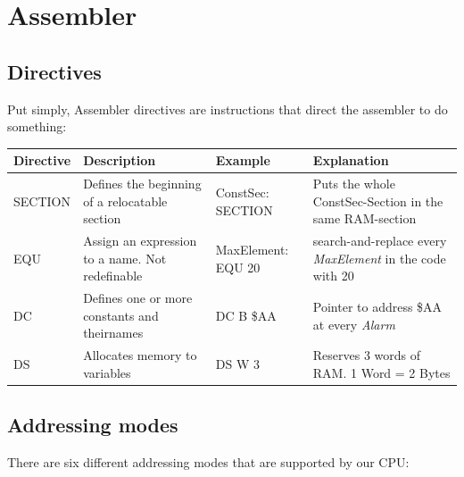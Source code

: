 \documentclass[a4paper, 11pt, nofootinbib]{book}
\renewcommand*{\thead}[1]{\bfseries #1}
\begin{document}
\newpage

\section{Assembler}
\subsection{Directives}
Put simply, Assembler directives are instructions that direct the assembler to do something:
\begin{center}
\begin{tabular}{|p{2cm}|p{5cm}|p{4cm}|p{5cm}|}
	\hline
	\thead{Directive} & \thead{Description} & \thead{Example} & \thead{Explanation} \\
	\hline
	SECTION & Defines the beginning of a relocatable section & ConstSec: SECTION & Puts the whole ConstSec-Section in the same RAM-section\\
	\hline
	EQU & Assign an expression to a name. Not redefinable & MaxElement: EQU 20 & search-and-replace every \textit{MaxElement} in the code with 20\\
	\hline
	DC & Defines one or more constants and theirnames & DC B \$AA & Pointer to address \$AA at every \textit{Alarm}\\
	\hline
	DS & Allocates memory to variables & DS W 3 & Reserves 3 words of RAM. 1 Word = 2 Bytes\\
	\hline
\end{tabular}
\end{center}

\subsection{Addressing modes}
There are six different addressing modes that are supported by our CPU:
\end{document}
